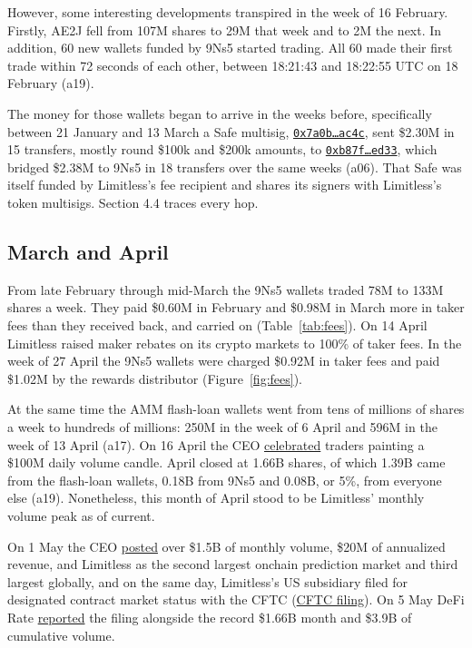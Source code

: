 \documentclass[11pt]{article}
\begin{document}
However, some interesting developments transpired in the week of 16 February.
Firstly, AE2J fell from 107M shares to 29M that week and to 2M the next.
In addition, 60 new wallets funded by 9Ns5 started trading.
All 60 made their first trade within 72 seconds of each other, between 18:21:43 and 18:22:55 UTC on 18 February (a19).

The money for those wallets began to arrive in the weeks before, specifically between 21 January and 13 March a Safe multisig, \href{https://basescan.org/address/0x7a0b16d55da33fa6bf1174532f33bba1914fac4c}{\texttt{0x7a0b\ldots ac4c}}, sent \$2.30M in 15 transfers, mostly round \$100k and \$200k amounts, to \href{https://basescan.org/address/0xb87f6670c965be9ecda4f5c8bfa7f5576658ed33}{\texttt{0xb87f\ldots ed33}}, which bridged \$2.38M to 9Ns5 in 18 transfers over the same weeks (a06).
That Safe was itself funded by Limitless's fee recipient and shares its signers with Limitless's token multisigs.
Section 4.4 traces every hop.

\subsection{March and April}

From late February through mid-March the 9Ns5 wallets traded 78M to 133M shares a week.
They paid \$0.60M in February and \$0.98M in March more in taker fees than they received back, and carried on (Table~\ref{tab:fees}).
On 14 April Limitless raised maker rebates on its crypto markets to 100\% of taker fees.
In the week of 27 April the 9Ns5 wallets were charged \$0.92M in taker fees and paid \$1.02M by the rewards distributor (Figure~\ref{fig:fees}).

At the same time the AMM flash-loan wallets went from tens of millions of shares a week to hundreds of millions: 250M in the week of 6 April and 596M in the week of 13 April (a17).
On 16 April the CEO \href{https://x.com/cjhtech/status/2044800783539904983}{celebrated} traders painting a \$100M daily volume candle.
April closed at 1.66B shares, of which 1.39B came from the flash-loan wallets, 0.18B from 9Ns5 and 0.08B, or 5\%, from everyone else (a19).
Nonetheless, this month of April stood to be Limitless' monthly volume peak as of current.

On 1 May the CEO \href{https://x.com/cjhtech/status/2050266878749331653}{posted} over \$1.5B of monthly volume, \$20M of annualized revenue, and Limitless as the second largest onchain prediction market and third largest globally, and on the same day, Limitless's US subsidiary filed for designated contract market status with the CFTC (\href{https://www.cftc.gov/IndustryOversight/IndustryFilings/TradingOrganizations/60686}{CFTC filing}).
On 5 May DeFi Rate \href{https://defirate.com/news/limitless-files-cftc-approval-after-record-1-66b-month/}{reported} the filing alongside the record \$1.66B month and \$3.9B of cumulative volume.
\end{document}
